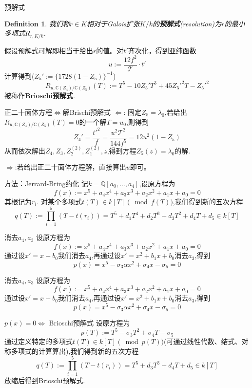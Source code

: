 \documentclass[pdf]{beamer}
\numberwithin{equation}{section}
\theoremstyle{plain}
\newtheorem{defn}[theorem]{Definition}
\theoremstyle{plain}
\theoremstyle{remark}
\begin{document}
\begin{frame}{预解式}
	\begin{defn}
		我们称$r \in K$相对于Galois扩张$K/k$的\textbf{预解式}(resolution)为$r$的最小多项式$R_{r,K/k}$.
	\end{defn}
假设预解式可解即相当于给出$r$的值。对$t'$齐次化，得到亚纯函数
$$u:=\frac{12f^2}{\mathcal{T}} \cdot t'$$
计算得到($Z_5':= \{1728(1-Z_5)\}^{-1}$)
$$R_{u,\mathbb{C}(Z_4)/\mathbb{C}(Z_5)}(T):=T^5-10Z_5'T^3+45{Z_5'}^2T-{Z_5'}^2$$
被称作\textbf{Brioschi预解式}.

\end{frame}
\begin{frame}{正二十面体方程$\Longleftrightarrow$解Brischi预解式}
	$\Leftarrow$: 固定$Z_5=\lambda_0$,若给出$R_{u,\mathbb{C}(Z_4)/\mathbb{C}(Z_5)}(T)=0$的一个解$T=u_0$,则得到
	$$Z_4'=\frac{t'^2}{f}=\frac{u^2\mathcal{T}^2}{144f^5}=12u^2(1-Z_5)$$
	从而依次解出$Z_4,Z_3,Z_2^{(2)},Z_1^{(2)},z$,得到方程$Z_5(z)=\lambda_0$的解.
	
	$\Rightarrow$:若给出正二十面体方程解，直接算出$u$即可。

\end{frame}
\begin{frame}{方法：Jerrard-Bring约化}
记$k=\mathbb{Q}[a_0,\ldots,a_4]$,设原方程为
$$f(x):=x^5+a_4x^4+a_3x^3+a_2x^2+a_1x+a_0=0$$
其根记为$r_i$.
对某个多项式$t(T) \in k[T] \; \big(\mod f(T)\big)$,我们得到新的五次方程
\begin{equation*}\label{eq:closetoBri}
q(T):=\prod_{i=1}^{5} (T-t(r_i))=T^5+d_1T^4+d_2T^3+d_3T^2+d_4T+d_5 \in k[T]
\end{equation*}

\end{frame}
\begin{frame}{消去$a_4,a_3$}
设原方程为
$$f(x):=x^5+a_4x^4+a_3x^3+a_2x^2+a_1x+a_0=0$$
通过设$x'=x+b_0$我们消去$a_4$,再通过设$x'=x^2+b_1x+b_0$消去$a_3$,得到
$$p(x)=x^5-\sigma_3\alpha x^2+\sigma_4 x-\sigma_5=0$$
\end{frame}
\begin{frame}{消去$a_4,a_3$}
设原方程为
$$f(x):=x^5+a_4x^4+a_3x^3+a_2x^2+a_1x+a_0=0$$
通过设$x'=x+b_0$我们消去$a_4$,再通过设$x'=x^2+b_1x+b_0$消去$a_3$,得到
$$p(x)=x^5-\sigma_3\alpha x^2+\sigma_4 x-\sigma_5=0$$
\end{frame}
\begin{frame}{$p(x)=0 \Longleftrightarrow $ Brioschi预解式}
设原方程为
$$p(T):=T^5-\sigma_3 T^2+\sigma_4 T -\sigma_5$$
通过定义特定的多项式$t(T) \in k[T] \; \big(\mod p(T)\big)$(可通过线性代数、结式、对称多项式的计算算出),我们得到新的五次方程
\begin{equation*}
q(T):=\prod_{i=1}^{5} (T-t(r_i))=T^5+d_3T^3+d_4T+d_5 \in k[T]
\end{equation*}
放缩后得到Brioschi预解式.
\end{frame}
\end{document}
